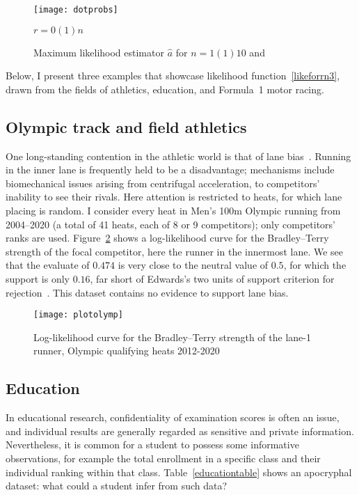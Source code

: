 \documentclass[article]{ajs}
\begin{document}
\begin{figure}[t]
  \begin{centering}
\texttt{[image: dotprobs]}  %
\caption{Maximum likelihood estimator $\hat{a}$ for $n=1(1)10$
  and\label{dotprobs}} $r=0(1)n$
\end{centering}
\end{figure}


Below, I present three examples that showcase likelihood
function~\ref{likeforrn3}, drawn from the fields of athletics,
education, and Formula~1 motor racing.

\subsection{Olympic track and field athletics}

One long-standing contention in the athletic world is that of lane
bias~\citep{munro2022}.  Running in the inner lane is frequently held
to be a disadvantage; mechanisms include biomechanical issues arising
from centrifugal acceleration, to competitors' inability to see their
rivals.  Here attention is restricted to heats, for which lane placing
is random.  I consider every heat in Men's 100m Olympic running from
2004--2020 (a total of 41 heats, each of 8 or 9 competitors); only
competitors' ranks are used.  Figure~\ref{plotolymp} shows a
log-likelihood curve for the Bradley--Terry strength of the focal
competitor, here the runner in the innermost lane.  We see that the
evaluate of $0.474$ is very close to the neutral value of $0.5$, for
which the support is only $0.16$, far short of Edwards's two units of
support criterion for rejection~\citep{edwards1972}.  This dataset
contains no evidence to support lane bias.

\begin{figure}[t]
  \begin{centering}
\texttt{[image: plotolymp]} %
\caption{Log-likelihood curve for the Bradley--Terry strength of the
  lane-1 runner, Olympic qualifying heats 2012-2020 \label{plotolymp}}
\end{centering}
\end{figure}

\subsection{Education}

In educational research, confidentiality of examination scores is
often an issue, and individual results are generally regarded as
sensitive and private information.  Nevertheless, it is common for a
student to possess some informative observations, for example the
total enrollment in a specific class and their individual ranking
within that class.  Table~\ref{educationtable} shows an apocryphal
dataset: what could a student infer from such data?
\end{document}
